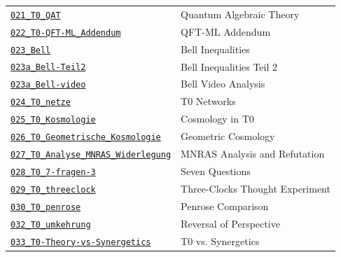 {\begin{longtable}{@{}>{\raggedright\arraybackslash}p{} >{\raggedright\arraybackslash}p{}@{}}
\href{https://github.com/jpascher/T0-Time-Mass-Duality/blob/main/2/pdf/021_T0_QAT_De.pdf}{\texttt{021\_T0\_QAT}} & Quantum Algebraic Theory \\
\href{https://github.com/jpascher/T0-Time-Mass-Duality/blob/main/2/pdf/022_T0-QFT-ML_Addendum_De.pdf}{\texttt{022\_T0-QFT-ML\_Addendum}} & QFT-ML Addendum \\
\href{https://github.com/jpascher/T0-Time-Mass-Duality/blob/main/2/pdf/023_Bell_De.pdf}{\texttt{023\_Bell}} & Bell Inequalities \\
\href{https://github.com/jpascher/T0-Time-Mass-Duality/blob/main/2/pdf/023a_Bell-Teil2_De.pdf}{\texttt{023a\_Bell-Teil2}} & Bell Inequalities Teil 2 \\
\href{https://github.com/jpascher/T0-Time-Mass-Duality/blob/main/2/pdf/023a_Bell-video_De.pdf}{\texttt{023a\_Bell-video}} & Bell Video Analysis \\
\href{https://github.com/jpascher/T0-Time-Mass-Duality/blob/main/2/pdf/024_T0_netze_De.pdf}{\texttt{024\_T0\_netze}} & T0 Networks \\
\href{https://github.com/jpascher/T0-Time-Mass-Duality/blob/main/2/pdf/025_T0_Kosmologie_De.pdf}{\texttt{025\_T0\_Kosmologie}} & Cosmology in T0 \\
\href{https://github.com/jpascher/T0-Time-Mass-Duality/blob/main/2/pdf/026_T0_Geometrische_Kosmologie_De.pdf}{\texttt{026\_T0\_Geometrische\_Kosmologie}} & Geometric Cosmology \\
\href{https://github.com/jpascher/T0-Time-Mass-Duality/blob/main/2/pdf/027_T0_Analyse_MNRAS_Widerlegung_De.pdf}{\texttt{027\_T0\_Analyse\_MNRAS\_Widerlegung}} & MNRAS Analysis and Refutation \\
\href{https://github.com/jpascher/T0-Time-Mass-Duality/blob/main/2/pdf/028_T0_7-fragen-3_De.pdf}{\texttt{028\_T0\_7-fragen-3}} & Seven Questions \\
\href{https://github.com/jpascher/T0-Time-Mass-Duality/blob/main/2/pdf/029_T0_threeclock_De.pdf}{\texttt{029\_T0\_threeclock}} & Three-Clocks Thought Experiment \\
\href{https://github.com/jpascher/T0-Time-Mass-Duality/blob/main/2/pdf/030_T0_penrose_De.pdf}{\texttt{030\_T0\_penrose}} & Penrose Comparison \\
\href{https://github.com/jpascher/T0-Time-Mass-Duality/blob/main/2/pdf/032_T0_umkehrung_De.pdf}{\texttt{032\_T0\_umkehrung}} & Reversal of Perspective \\
\href{https://github.com/jpascher/T0-Time-Mass-Duality/blob/main/2/pdf/033_T0-Theory-vs-Synergetics_De.pdf}{\texttt{033\_T0-Theory-vs-Synergetics}} & T0 vs. Synergetics \\

\end{longtable}}
